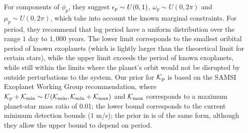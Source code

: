 For components of $\phi_p$, they suggest $\epsilon_p \sim U(0,1)$, $\omega_p \sim U(0, 2
\pi)$ and $\mu_p \sim U(0, 2 \pi)$, which take into account the known
marginal constraints.  For period, they recommend that log period have
a uniform distribution over the range $1$ day to $1,000$ years.  The
lower limit corresponds to the smallest oribital period of known
exoplanets (which is lightly larger than the theoretical limit for
certain stars), while the upper limit exceeds the period of known
exoplanets, while still within the limits where the planet's orbit would not be
disrupted by outside perturbations to the system.  Our prior for ${\cal{K}}_p$
is based on the SAMSI Exoplanet Working Group recommendation, where
${\cal{K}}_p + {\cal{K}}_{\min} \sim  U({\cal{K}}_{\min}, {\cal{K}}_{\min} + {\cal{K}}_{\max})$ and 
${\cal{K}}_{\max}$ corresponds to a maximum 
planet-star mass ratio of 0.01;  the lower bound corresponds to the
current minimum detection bounds ($1$ m/s); the prior in
\citet{ford2006bms} is of the same form, although they allow the upper
bound to depend on period.



